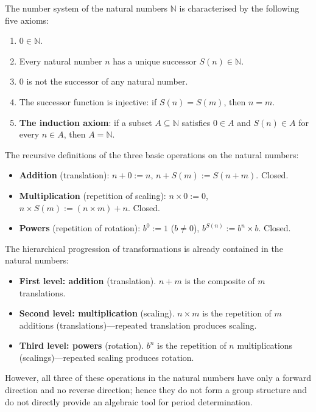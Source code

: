 \begin{axiom}\label{ax:peano}
The number system of the natural numbers $\mathbb{N}$ is characterised by the following five axioms:
\begin{enumerate}[label=(\arabic*)]
    \item $0 \in \mathbb{N}$.
    \item Every natural number $n$ has a unique successor $S(n) \in \mathbb{N}$.
    \item $0$ is not the successor of any natural number.
    \item The successor function is injective: if $S(n) = S(m)$, then $n = m$.
    \item \textbf{The induction axiom}: if a subset $A \subseteq \mathbb{N}$ satisfies $0 \in A$ and $S(n) \in A$ for every $n \in A$, then $A = \mathbb{N}$.
\end{enumerate}
\end{axiom}

\begin{definition}\label{def:nat_operations}
The recursive definitions of the three basic operations on the natural numbers:
\begin{itemize}
    \item \textbf{Addition} (translation): $n + 0 := n$, $n + S(m) := S(n + m)$. Closed.
    \item \textbf{Multiplication} (repetition of scaling): $n \times 0 := 0$, $n \times S(m) := (n \times m) + n$. Closed.
    \item \textbf{Powers} (repetition of rotation): $b^0 := 1$ ($b \neq 0$), $b^{S(n)} := b^n \times b$. Closed.
\end{itemize}
\end{definition}

\begin{remark}\label{rem:nat_hierarchy}
The hierarchical progression of transformations is already contained in the natural numbers:
\begin{itemize}
    \item \textbf{First level: addition} (translation). $n + m$ is the composite of $m$ translations.
    \item \textbf{Second level: multiplication} (scaling). $n \times m$ is the repetition of $m$ additions (translations)---repeated translation produces scaling.
    \item \textbf{Third level: powers} (rotation). $b^n$ is the repetition of $n$ multiplications (scalings)---repeated scaling produces rotation.
\end{itemize}
However, all three of these operations in the natural numbers have only a forward direction and no reverse direction; hence they do not form a group structure and do not directly provide an algebraic tool for period determination.
\end{remark}

